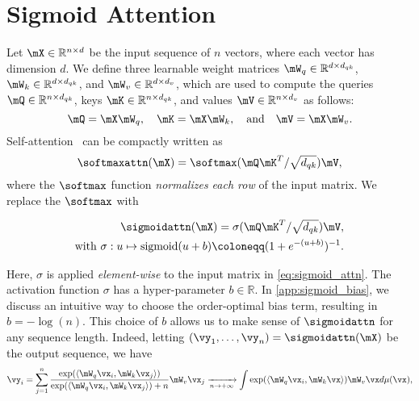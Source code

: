 \section{Sigmoid Attention}
\label{sec:methods}

Let $\mX \in \mathbb{R}^{n \times d}$ be the input sequence of $n$ vectors, where each vector has dimension $d$. We define three learnable weight matrices $\mW_q \in \mathbb{R}^{d \times d_{qk}}$, $\mW_k \in \mathbb{R}^{d \times d_{qk}}$, and $\mW_v \in \mathbb{R}^{d \times d_v}$, which are used to compute the queries $\mQ \in \mathbb{R}^{n \times d_{qk}}$, keys $\mK \in \mathbb{R}^{n \times d_{qk}}$, and values $\mV \in \mathbb{R}^{n \times d_v}$ as follows:
\begin{equation}
\mQ = \mX \mW_q, \quad \mK = \mX \mW_k, \quad \text{and} \quad \mV = \mX \mW_v.
\end{equation}
Self-attention~\citep{DBLP:journals/corr/BahdanauCB14,DBLP:conf/nips/VaswaniSPUJGKP17} can be compactly written as
\begin{equation}
\label{eq:attn_short}
\softmaxattn(\mX) = \softmax(\mQ \mK^T / \sqrt{d_{qk}}) \mV,
\end{equation}
where the $\softmax$ function \textit{normalizes each row }of the input matrix.
We  replace the $\softmax$ with
\begin{tcolorbox}[colback=applelightblue, colframe=black, boxrule=1pt, arc=5mm, boxsep=1mm, left=0mm, top=0mm, right=2mm, valign=center]
\begin{align}
\begin{split}
    \label{eq:sigmoid_attn}
    \sigmoidattn(\mX) = \sigma(\mQ\mK^T / \sqrt{d_{qk}})\mV,\\
    \text{with }\sigma:u\mapsto \mathrm{sigmoid}(u + b)\coloneqq (1+e^{-(u+b)})^{-1}.
\end{split}
\end{align}
\end{tcolorbox}
Here, $\sigma$ is applied \textit{element-wise} to the input matrix in \cref{eq:sigmoid_attn}.
The activation function $\sigma$ has a hyper-parameter $b\in\mathbb{R}$. In \cref{app:sigmoid_bias}, we discuss an intuitive way to choose the order-optimal bias term, resulting in $b = -\log(n)$.
This choice of $b$ allows us to make sense of $\sigmoidattn$ for any sequence length.
Indeed, letting $(\vy_1, \dots, \vy_n) = \sigmoidattn(\mX)$ be the output sequence, we have
\begin{equation}
    \label{eq:sigmoid_attn_sequence}
    \vy_i = \sum_{j=1}^n \frac{\exp(\langle \mW_q\vx_i, \mW_k\vx_j\rangle)}{\exp(\langle \mW_q\vx_i, \mW_k\vx_j\rangle) + n}\mW_v\vx_j
    \xrightarrow[n\to+\infty]{} \int \exp(\langle \mW_q\vx_i, \mW_k\vx \rangle)\mW_v\vx d\mu(\vx),
\end{equation}
